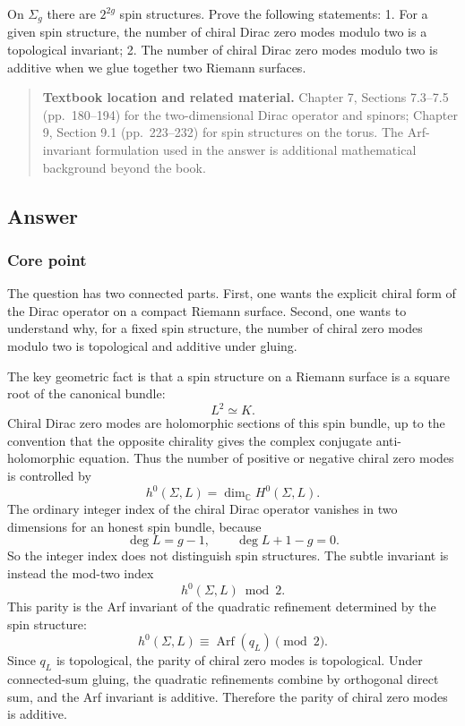 \documentclass[
  10pt,
  a4paper,
  openany]{book}
\begin{document}
On \(\Sigma_{g}\) there are \(2^{2g}\) spin structures. Prove the
following statements: 1. For a given spin structure, the number of
chiral Dirac zero modes modulo two is a topological invariant; 2. The
number of chiral Dirac zero modes modulo two is additive when we glue
together two Riemann surfaces.

\begin{quote}
\textbf{Textbook location and related material.} Chapter 7, Sections
7.3--7.5 (pp.~180--194) for the two-dimensional Dirac operator and
spinors; Chapter 9, Section 9.1 (pp.~223--232) for spin structures on
the torus. The Arf-invariant formulation used in the answer is
additional mathematical background beyond the book.
\end{quote}

\subsection{Answer}\label{answer-4}

\subsubsection{Core point}\label{core-point-4}

The question has two connected parts. First, one wants the explicit
chiral form of the Dirac operator on a compact Riemann surface. Second,
one wants to understand why, for a fixed spin structure, the number of
chiral zero modes modulo two is topological and additive under gluing.

The key geometric fact is that a spin structure on a Riemann surface is
a square root of the canonical bundle: \[
L^2\simeq K.
\] Chiral Dirac zero modes are holomorphic sections of this spin bundle,
up to the convention that the opposite chirality gives the complex
conjugate anti-holomorphic equation. Thus the number of positive or
negative chiral zero modes is controlled by \[
h^0(\Sigma,L)=\dim_{\mathbb C} H^0(\Sigma,L).
\] The ordinary integer index of the chiral Dirac operator vanishes in
two dimensions for an honest spin bundle, because \[
\deg L=g-1,
\qquad
\deg L+1-g=0.
\] So the integer index does not distinguish spin structures. The subtle
invariant is instead the mod-two index \[
h^0(\Sigma,L)\bmod 2.
\] This parity is the Arf invariant of the quadratic refinement
determined by the spin structure: \[
h^0(\Sigma,L)\equiv \operatorname{Arf}(q_L)\pmod 2.
\] Since \(q_L\) is topological, the parity of chiral zero modes is
topological. Under connected-sum gluing, the quadratic refinements
combine by orthogonal direct sum, and the Arf invariant is additive.
Therefore the parity of chiral zero modes is additive.
\end{document}
